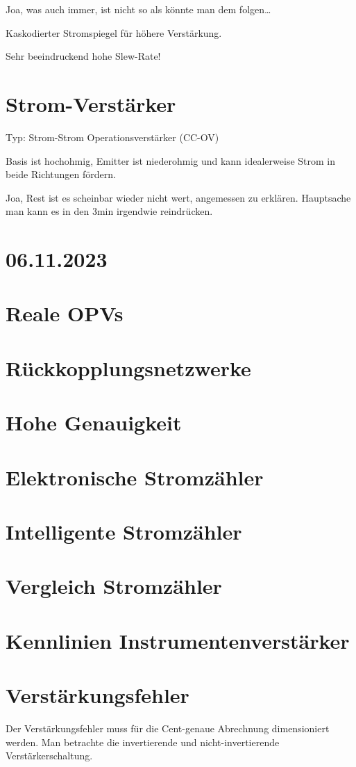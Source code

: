 \documentclass[a4paper]{article}
\begin{document}
\begin{itemize}
Joa, was auch immer, ist nicht so als könnte man dem folgen\ldots

Kaskodierter Stromspiegel für höhere Verstärkung.

Sehr beeindruckend hohe Slew-Rate!

\section*{Strom-Verstärker}
Typ: Strom-Strom Operationsverstärker (CC-OV)

Basis ist hochohmig, Emitter ist niederohmig und kann idealerweise Strom in
beide Richtungen fördern.

Joa, Rest ist es scheinbar wieder nicht wert, angemessen zu erklären.
Hauptsache man kann es in den 3min irgendwie reindrücken.


\section*{06.11.2023}
\section*{Reale OPVs}
\section*{Rückkopplungsnetzwerke}
\section*{Hohe Genauigkeit}
\section*{Elektronische Stromzähler}
\section*{Intelligente Stromzähler}
\section*{Vergleich Stromzähler}
\section*{Kennlinien Instrumentenverstärker}
\section*{Verstärkungsfehler}
Der Verstärkungsfehler muss für die Cent-genaue Abrechnung dimensioniert werden.
Man betrachte die invertierende und nicht-invertierende Verstärkerschaltung.

\end{itemize}
\end{document}
